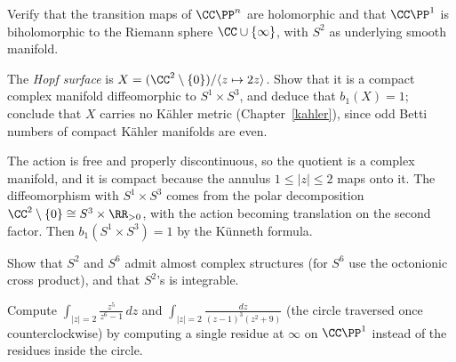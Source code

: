 \begin{exercise}\label{complex-manifolds:exercise-projective-space-charts}
Verify that the transition maps of $\CC\PP^n$ are holomorphic and that $\CC\PP^1$ is biholomorphic to the Riemann sphere $\CC \cup \{\infty\}$, with $S^2$ as underlying smooth manifold.
\end{exercise}

\begin{exercise}\label{complex-manifolds:exercise-hopf-surface}
The \emph{Hopf surface} is $X = (\CC^2 \setminus \{0\})/\langle z \mapsto 2z\rangle$. Show that it is a compact complex manifold diffeomorphic to $S^1 \times S^3$, and deduce that $b_1(X) = 1$; conclude that $X$
carries no K\"ahler metric (Chapter~\ref{kahler}), since odd Betti numbers of compact K\"ahler manifolds are even.
\end{exercise}

\begin{solution}
The action is free and properly discontinuous, so the quotient is a complex manifold, and it is compact because the annulus $1 \leq |z| \leq 2$ maps onto it. The diffeomorphism with $S^1 \times S^3$ comes from
the polar decomposition $\CC^2 \setminus \{0\} \cong S^3 \times \RR_{>0}$, with the action becoming translation on the second factor. Then $b_1(S^1 \times S^3) = 1$ by the K\"unneth formula.
\end{solution}

\begin{exercise}\label{complex-manifolds:exercise-almost-complex-s6}
Show that $S^2$ and $S^6$ admit almost complex structures (for $S^6$ use the octonionic cross product), and that $S^2$'s is integrable.
\end{exercise}

\begin{exercise}\label{complex-manifolds:exercise-residue-infinity}
Compute $\int_{|z| = 2}\frac{z^5}{z^6 - 1}\,dz$ and $\int_{|z| = 2}\frac{dz}{(z - 1)^3(z^2 + 9)}$ (the circle traversed once counterclockwise) by computing a single residue at $\infty$ on $\CC\PP^1$ instead of the residues
inside the circle.
\end{exercise}

